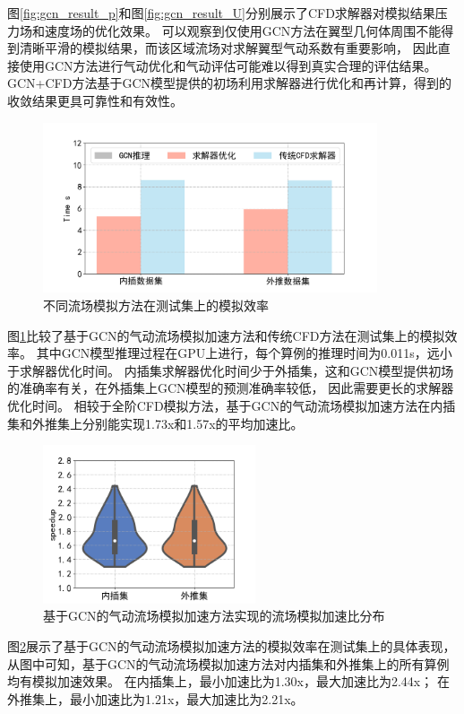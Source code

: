 图\ref{fig:gcn_result_p}和图\ref{fig:gcn_result_U}分别展示了CFD求解器对模拟结果压力场和速度场的优化效果。
可以观察到仅使用GCN方法在翼型几何体周围不能得到清晰平滑的模拟结果，而该区域流场对求解翼型气动系数有重要影响，
因此直接使用GCN方法进行气动优化和气动评估可能难以得到真实合理的评估结果。
GCN+CFD方法基于GCN模型提供的初场利用求解器进行优化和再计算，得到的收敛结果更具可靠性和有效性。


\begin{figure}[htp]
	\centering
	\includegraphics[width=0.88\textwidth]{figures/gcn_result/time.png}
	\caption{不同流场模拟方法在测试集上的模拟效率}
	\label{fig:timeresult}
\end{figure}

图\ref{fig:timeresult}比较了基于GCN的气动流场模拟加速方法和传统CFD方法在测试集上的模拟效率。
其中GCN模型推理过程在GPU上进行，每个算例的推理时间为0.011s，远小于求解器优化时间。
内插集求解器优化时间少于外插集，这和GCN模型提供初场的准确率有关，在外插集上GCN模型的预测准确率较低，
因此需要更长的求解器优化时间。
相较于全阶CFD模拟方法，基于GCN的气动流场模拟加速方法在内插集和外推集上分别能实现1.73x和1.57x的平均加速比。



\begin{figure}[htp]
	\centering
	\includegraphics[width=0.56\textwidth]{figures/gcn_result/speedup.png}
	\caption{基于GCN的气动流场模拟加速方法实现的流场模拟加速比分布}
	\label{fig:speedup}
\end{figure}
图\ref{fig:speedup}展示了基于GCN的气动流场模拟加速方法的模拟效率在测试集上的具体表现，
从图中可知，基于GCN的气动流场模拟加速方法对内插集和外推集上的所有算例均有模拟加速效果。
在内插集上，最小加速比为1.30x，最大加速比为2.44x；
在外推集上，最小加速比为1.21x，最大加速比为2.21x。


